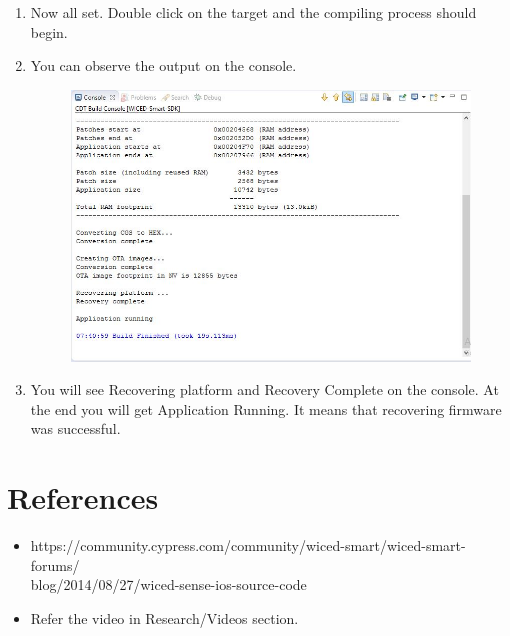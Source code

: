 \documentclass[11pt,a4paper]{article}
\begin{document}
\begin{enumerate}
	   \newpage
    \item Now all set. Double click on the target and the compiling process should begin.
    \item You can observe the output on the console.
    
    \begin{figure}[h]
        \centering
    	\includegraphics[scale=0.5]{recovery_complete.JPG}
    	\caption{}
	    \end{figure}
	    
    \item You will see Recovering platform and Recovery Complete on the console. At the end you will get Application Running. It means that recovering firmware was successful.

 
 	\end{enumerate}
 
 \newpage
	\section{References}
	 \begin{itemize}
	 \item https://community.cypress.com/community/wiced-smart/wiced-smart-forums/\\blog/2014/08/27/wiced-sense-ios-source-code
	 \item Refer the video in Research/Videos section.
	    \end{itemize}
 
 
\end{document}
